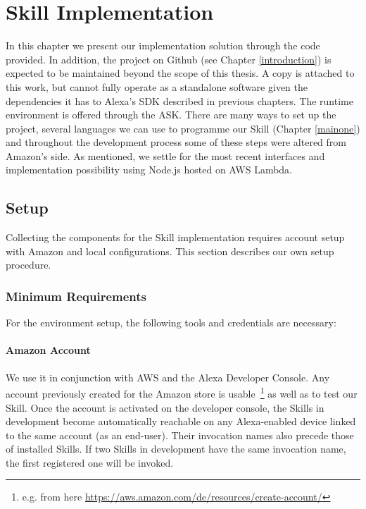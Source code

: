 \chapter{Skill Implementation}%
\label{maintwo}

In this chapter we present our implementation solution through the code provided. %
In addition, the project on Github (see Chapter \ref{introduction}) is expected to be maintained %
beyond the scope of this thesis. A copy is attached to this work, but cannot fully operate as a standalone software given the dependencies it has to Alexa's SDK described in previous chapters. The runtime environment is offered through the ASK. %
There are many ways to %
set up the project, several languages we can use to programme 
our Skill (Chapter \ref{mainone}) and throughout the development process some of these steps were altered from Amazon's side. %
As mentioned, we settle for the most recent interfaces and implementation possibility using Node.js hosted on AWS Lambda. %

\section{Setup}

Collecting the components for the Skill implementation requires account setup with Amazon and local configurations. This section describes our own setup procedure.



\subsection*{Minimum Requirements}
For the environment setup, the following tools and credentials are necessary:

\subsubsection*{Amazon Account}
We use it in conjunction with AWS and the Alexa Developer Console. Any account previously created for the Amazon store is usable~\footnote{e.g. from here  \url{https://aws.amazon.com/de/resources/create-account/}} as well as to test our Skill. Once the account is activated on the developer console, the Skills in development become automatically reachable on any Alexa-enabled device linked to the same account (as an end-user). Their invocation names also precede those of installed Skills. If two Skills in development have the same invocation name, the first registered one will be invoked.
	
